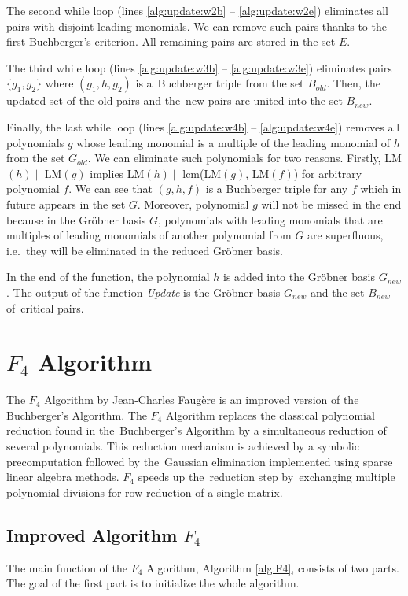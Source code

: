 The second while loop (lines \ref{alg:update:w2b} -- \ref{alg:update:w2e}) eliminates all pairs with disjoint leading monomials. We can remove such pairs thanks to the first Buchberger's criterion. All remaining pairs are stored in the set $E$.

The third while loop (lines \ref{alg:update:w3b} -- \ref{alg:update:w3e}) eliminates pairs $\{g_1, g_2\}$ where $(g_1, h, g_2)$ is a~Buchberger triple from the set $B_{old}$. Then, the updated set of the old pairs and the~new pairs are united into the set $B_{new}$.

Finally, the last while loop (lines \ref{alg:update:w4b} -- \ref{alg:update:w4e}) removes all polynomials $g$ whose leading monomial is a multiple of the leading monomial of $h$ from the set $G_{old}$. We can eliminate such polynomials for two reasons. Firstly, LM$(h) \mid$ LM$(g)$ implies LM$(h) \mid$ lcm(LM$(g)$, LM$(f)$) for arbitrary polynomial $f$. We can see that $(g, h, f)$ is a Buchberger triple for any $f$ which in future appears in the set $G$. Moreover, polynomial $g$ will not be missed in the end because in the Gr\"obner basis $G$, polynomials with leading monomials that are multiples of leading monomials of another polynomial from $G$ are superfluous, i.e.\ they will be eliminated in the reduced Gr\"obner basis.

In the end of the function, the polynomial $h$ is added into the Gr\"obner basis $G_{new}$. The output of the function \textit{Update} is the Gr\"obner basis $G_{new}$ and the set $B_{new}$ of~critical pairs.



\section{$F_4$ Algorithm}
\label{sec:F4}
The $F_4$ Algorithm \cite{F4} by Jean-Charles Faug\`ere is an improved version of the Buchberger's Algorithm. The $F_4$ Algorithm replaces the classical polynomial reduction found in the~Buchberger's Algorithm by a simultaneous reduction of several polynomials. This reduction mechanism is achieved by a symbolic precomputation followed by the~Gaussian elimination implemented using sparse linear algebra methods. $F_4$ speeds up the~reduction step by~exchanging multiple polynomial divisions for row-reduction of a single matrix.

\subsection{Improved Algorithm $F_4$}
The main function of the $F_4$ Algorithm, Algorithm \ref{alg:F4}, consists of two parts. The goal of the first part is to initialize the whole algorithm.


